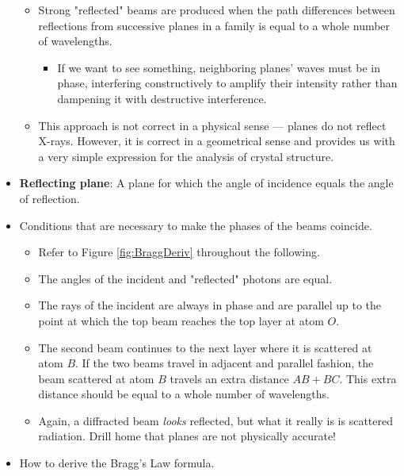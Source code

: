\documentclass[../notes.tex]{subfiles}
\begin{document}
\begin{itemize}
\begin{itemize}
        \item Strong "reflected" beams are produced when the path differences between reflections from successive planes in a family is equal to a whole number of wavelengths.
        \begin{itemize}
            \item If we want to see something, neighboring planes' waves must be in phase, interfering constructively to amplify their intensity rather than dampening it with destructive interference.
        \end{itemize}
        \item This approach is not correct in a physical sense --- planes do not reflect X-rays. However, it is correct in a geometrical sense and provides us with a very simple expression for the analysis of crystal structure.
    \end{itemize}
    \item \textbf{Reflecting plane}: A plane for which the angle of incidence equals the angle of reflection.
    \item Conditions that are necessary to make the phases of the beams coincide.
    \begin{itemize}
        \item Refer to Figure \ref{fig:BraggDeriv} throughout the following.
        \item The angles of the incident and "reflected" photons are equal.
        \item The rays of the incident are always in phase and are parallel up to the point at which the top beam reaches the top layer at atom $O$.
        \item The second beam continues to the next layer where it is scattered at atom $B$. If the two beams travel in adjacent and parallel fashion, the beam scattered at atom $B$ travels an extra distance $AB+BC$. This extra distance should be equal to a whole number of wavelengths.
        \item Again, a diffracted beam \emph{looks} reflected, but what it really is is scattered radiation. Drill home that planes are not physically accurate!
    \end{itemize}
    \item How to derive the Bragg's Law formula.
    \begin{figure}[h!]
        \centering
\end{figure}
\end{itemize}
\end{document}
